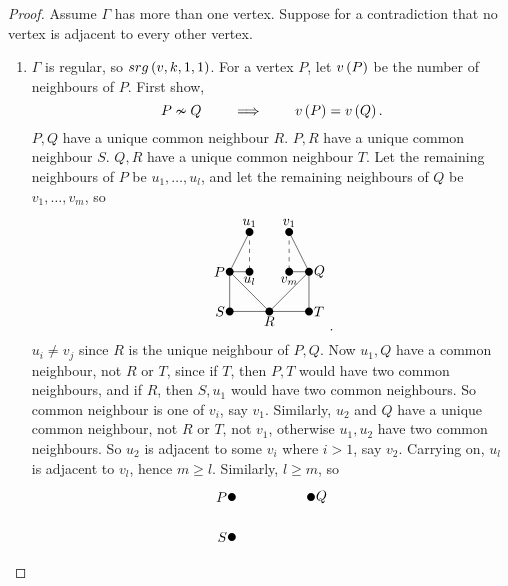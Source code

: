 \begin{proof}
Assume $ \Gamma $ has more than one vertex. Suppose for a contradiction that no vertex is adjacent to every other vertex.
\begin{enumerate}[leftmargin=0.5in, label=Step \arabic*.]
\item $ \Gamma $ is regular, so $ srg\br{v, k, 1, 1} $. For a vertex $ P $, let $ v\br{P} $ be the number of neighbours of $ P $. First show,
\begin{equation}
\label{eq:3}
P \nsim Q \qquad \implies \qquad v\br{P} = v\br{Q}.
\end{equation}
$ P, Q $ have a unique common neighbour $ R $. $ P, R $ have a unique common neighbour $ S $. $ Q, R $ have a unique common neighbour $ T $. Let the remaining neighbours of $ P $ be $ u_1, \dots, u_l $, and let the remaining neighbours of $ Q $ be $ v_1, \dots, v_m $, so
$$
\begin{tikzpicture}
\fill (0, 0) circle (0.1) node[left]{$ P $};
\fill (2, 0) circle (0.1) node[right]{$ Q $};
\fill (0, -1) circle (0.1) node[left]{$ S $};
\fill (1, -1) circle (0.1) node[below]{$ R $};
\fill (2, -1) circle (0.1) node[right]{$ T $};
\fill (0.5, 1) circle (0.1) node[above]{$ u_1 $};
\fill (0.5, 0) circle (0.1) node[below]{$ u_l $};
\fill (1.5, 1) circle (0.1) node[above]{$ v_1 $};
\fill (1.5, 0) circle (0.1) node[below]{$ v_m $};
\draw (0, 0) to (1, -1);
\draw (2, 0) to (1, -1);
\draw (0, 0) to (0, -1);
\draw (1, -1) to (0, -1);
\draw (2, 0) to (2, -1);
\draw (1, -1) to (2, -1);
\draw (0, 0) to (0.5, 1);
\draw (0, 0) to (0.5, 0);
\draw [dashed] (0.5, 1) to (0.5, 0);
\draw (2, 0) to (1.5, 1);
\draw (2, 0) to (1.5, 0);
\draw [dashed] (1.5, 1) to (1.5, 0);
\end{tikzpicture}.
$$
$ u_i \ne v_j $ since $ R $ is the unique neighbour of $ P, Q $. Now $ u_1, Q $ have a common neighbour, not $ R $ or $ T $, since if $ T $, then $ P, T $ would have two common neighbours, and if $ R $, then $ S, u_1 $ would have two common neighbours. So common neighbour is one of $ v_i $, say $ v_1 $. Similarly, $ u_2 $ and $ Q $ have a unique common neighbour, not $ R $ or $ T $, not $ v_1 $, otherwise $ u_1, u_2 $ have two common neighbours. So $ u_2 $ is adjacent to some $ v_i $ where $ i > 1 $, say $ v_2 $. Carrying on, $ u_l $ is adjacent to $ v_l $, hence $ m \ge l $. Similarly, $ l \ge m $, so
$$
\begin{tikzpicture}
\fill (0, 0) circle (0.1) node[left]{$ P $};
\fill (2, 0) circle (0.1) node[right]{$ Q $};
\fill (0, -1) circle (0.1) node[left]{$ S $};

\end{tikzpicture}$$
\end{enumerate}
\end{proof}
